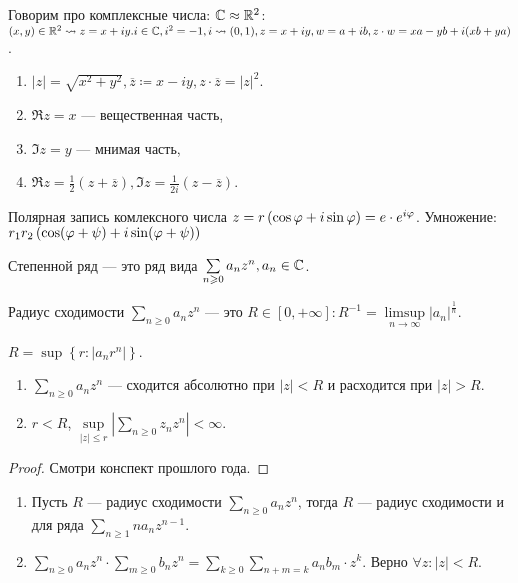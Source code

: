 Говорим про комплексные числа: $\mathbb{C} \approx \mathbb{R}^2$: $(x, y) \in \mathbb{R}^2 \leadsto z = x + iy. i \in \mathbb{C}, i^2 = -1, i \leadsto (0, 1), z = x+iy, w = a+ib, z \cdot w = xa - yb + i(xb+ya)$.
\begin{properties}
    \begin{enumerate}
        \item $|z| = \sqrt{x^2+y^2}, \overline{z} \coloneqq x - iy, z \cdot \overline{z} = |z|^2$.
        \item $\Re z = x$ --- вещественная часть,
        \item  $\Im z = y$ --- мнимая часть,
        \item $\Re z = \frac{1}{2} \left( z + \overline{z} \right), \Im z = \frac{1}{2i}\left( z - \overline{z} \right)$.
    \end{enumerate}
\end{properties}
\begin{definition}
    Полярная запись комлексного числа $z = r \left( \cos \varphi + i \sin \varphi \right) = e \cdot e^{i\varphi}$. Умножение: $r_1r_2\left( \cos (\varphi + \psi) + i\sin(\varphi + \psi) \right)$
\end{definition}
\begin{definition}
    Степенной ряд --- это ряд вида $\sum\limits_{n \geqslant  0} a_nz^n, a_n \in \mathbb{C}$.
    
    Радиус сходимости $\sum\limits_{n \ge 0} a_nz^n$ --- это $R \in \left[ 0, +\infty \right]\!: R^{-1} = \limsup\limits_{n \to \infty} |a_n|^{\frac{1}{n}}$.

    $R = \sup \left\{ r\!: |a_n r^n| \right\}$.
\end{definition}
\begin{statement}
    \slashn
    \begin{enumerate}
        \item $\sum\limits_{n \ge 0} a_n z^n$ --- сходится абсолютно при $|z| < R$ и расходится при  $|z| > R$.
        \item  $r < R$,  $\sup\limits_{|z|\le  r} \left| \sum\limits_{n \ge  0} z_n z^n \right| < \infty$.
    \end{enumerate}
\end{statement}
\begin{proof}
    Смотри конспект прошлого года.
\end{proof}
\begin{statement}
    \slashn
     \begin{enumerate}
         \item Пусть $R$ --- радиус сходимости  $\sum\limits_{n \ge  0} a_nz^n$, тогда $R$ --- радиус сходимости и для ряда  $\sum\limits_{n \ge 1} n a_n z^{n-1}$.
         \item $\sum\limits_{n \ge 0} a_n z^n \cdot \sum\limits_{m \ge  0} b_n z^n = \sum\limits_{k \ge 0} \sum\limits_{n + m = k} a_nb_m \cdot z^k$. Верно $\forall z\!: |z| < R$.
    \end{enumerate}
\end{statement}
